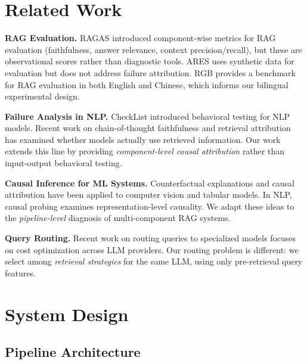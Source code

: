 \documentclass[11pt,a4paper]{article}
\begin{document}
\section{Related Work}

\textbf{RAG Evaluation.} RAGAS \cite{es2023ragas} introduced component-wise metrics for RAG evaluation (faithfulness, answer relevance, context precision/recall), but these are observational scores rather than diagnostic tools. ARES \cite{saad2023ares} uses synthetic data for evaluation but does not address failure attribution. RGB \cite{chen2023rgb} provides a benchmark for RAG evaluation in both English and Chinese, which informs our bilingual experimental design.

\textbf{Failure Analysis in NLP.} CheckList \cite{ribeiro2020checklist} introduced behavioral testing for NLP models. Recent work on chain-of-thought faithfulness \cite{lanham2023measuring} and retrieval attribution \cite{yue2023retrieval} has examined whether models actually use retrieved information. Our work extends this line by providing \textit{component-level causal attribution} rather than input-output behavioral testing.

\textbf{Causal Inference for ML Systems.} Counterfactual explanations \cite{wachter2017counterfactual} and causal attribution \cite{chattopadhyay2019attribution} have been applied to computer vision and tabular models. In NLP, causal probing \cite{feder2021causal} examines representation-level causality. We adapt these ideas to the \textit{pipeline-level} diagnosis of multi-component RAG systems.

\textbf{Query Routing.} Recent work on routing queries to specialized models \cite{chen2023frugalgpt,ong2024route} focuses on cost optimization across LLM providers. Our routing problem is different: we select among \textit{retrieval strategies} for the same LLM, using only pre-retrieval query features.

\section{System Design}

\subsection{Pipeline Architecture}
\end{document}

